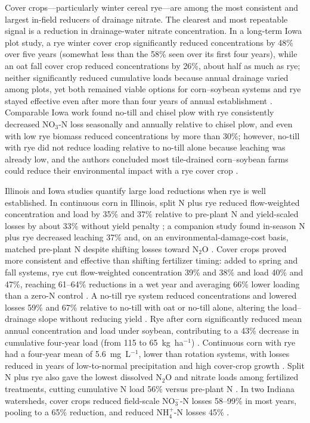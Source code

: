 \documentclass[11pt]{article}
\begin{document}
Cover crops---particularly winter cereal rye---are among the most consistent and largest in-field reducers of drainage nitrate. The clearest and most repeatable signal is a reduction in drainage-water nitrate concentration. In a long-term Iowa plot study, a rye winter cover crop significantly reduced concentrations by 48\% over five years (somewhat less than the 58\% seen over its first four years), while an oat fall cover crop reduced concentrations by 26\%, about half as much as rye; neither significantly reduced cumulative loads because annual drainage varied among plots, yet both remained viable options for corn--soybean systems and rye stayed effective even after more than four years of annual establishment \parencite{Kaspar2012}. Comparable Iowa work found no-till and chisel plow with rye consistently decreased NO$_3$-N loss seasonally and annually relative to chisel plow, and even with low rye biomass reduced concentrations by more than 30\%; however, no-till with rye did not reduce loading relative to no-till alone because leaching was already low, and the authors concluded most tile-drained corn--soybean farms could reduce their environmental impact with a rye cover crop \parencite{Waring2020}.

Illinois and Iowa studies quantify large load reductions when rye is well established. In continuous corn in Illinois, split N plus rye reduced flow-weighted concentration and load by 35\% and 37\% relative to pre-plant N and yield-scaled losses by about 33\% without yield penalty \parencite{PrezaFontes2021}; a companion study found in-season N plus rye decreased leaching 37\% and, on an environmental-damage-cost basis, matched pre-plant N despite shifting losses toward N$_2$O \parencite{PrezaFontes2023}. Cover crops proved more consistent and effective than shifting fertilizer timing: added to spring and fall systems, rye cut flow-weighted concentration 39\% and 38\% and load 40\% and 47\%, reaching 61--64\% reductions in a wet year and averaging 66\% lower loading than a zero-N control \parencite{Ruffatti2019}. A no-till rye system reduced concentrations and lowered losses 59\% and 67\% relative to no-till with oat or no-till alone, altering the load--drainage slope without reducing yield \parencite{OBrien2022}. Rye after corn significantly reduced mean annual concentration and load under soybean, contributing to a 43\% decrease in cumulative four-year load (from 115 to 65~kg~ha$^{-1}$) \parencite{Gentry2024}. Continuous corn with rye had a four-year mean of 5.6~mg~L$^{-1}$, lower than rotation systems, with losses reduced in years of low-to-normal precipitation and high cover-crop growth \parencite{Daigh2015b}. Split N plus rye also gave the lowest dissolved N$_2$O and nitrate loads among fertilized treatments, cutting cumulative N load 56\% versus pre-plant N \parencite{Oliveira2025}. In two Indiana watersheds, cover crops reduced field-scale NO$_3^-$-N losses 58--99\% in most years, pooling to a 65\% reduction, and reduced NH$_4^+$-N losses 45\% \parencite{Vincent2025}.
\end{document}
